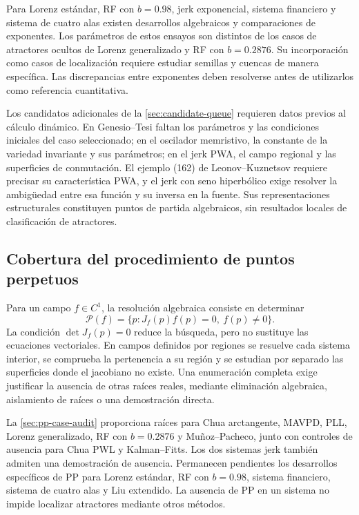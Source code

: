 Para Lorenz estándar, RF con \(b=0.98\), jerk exponencial, sistema financiero
y sistema de cuatro alas existen desarrollos algebraicos y comparaciones de
exponentes. Los parámetros de estos ensayos son distintos de los casos de
atractores ocultos de Lorenz generalizado y RF con \(b=0.2876\).
Su incorporación como casos de localización requiere estudiar semillas y
cuencas de manera específica. Las discrepancias entre exponentes deben
resolverse antes de utilizarlos como referencia cuantitativa.

Los candidatos adicionales de la \cref{sec:candidate-queue} requieren datos
previos al cálculo dinámico. En Genesio--Tesi faltan los parámetros y las
condiciones iniciales del caso seleccionado; en el oscilador memristivo, la
constante de la variedad invariante y sus parámetros; en el jerk PWA, el
campo regional y las superficies de conmutación. El ejemplo (162) de
Leonov--Kuznetsov requiere precisar su característica PWA, y el jerk con seno
hiperbólico exige resolver la ambigüedad entre esa función y su inversa en la
fuente. Sus representaciones estructurales constituyen puntos de partida
algebraicos, sin resultados locales de clasificación de atractores.

\subsection{Cobertura del procedimiento de puntos perpetuos}

Para un campo \(f\in C^1\), la resolución algebraica consiste en determinar
\[
 \mathcal P(f)=\{p:J_f(p)f(p)=0,\ f(p)\ne0\}.
\]
La condición \(\det J_f(p)=0\) reduce la búsqueda, pero no sustituye las
ecuaciones vectoriales. En campos definidos por regiones se resuelve cada
sistema interior, se comprueba la pertenencia a su región y se estudian por
separado las superficies donde el jacobiano no existe. Una enumeración
completa exige justificar la ausencia de otras raíces reales, mediante
eliminación algebraica, aislamiento de raíces o una demostración directa.

La \cref{sec:pp-case-audit} proporciona raíces para Chua arctangente, MAVPD,
PLL, Lorenz generalizado, RF con \(b=0.2876\) y Muñoz--Pacheco, junto con
controles de ausencia para Chua PWL y Kalman--Fitts. Los dos sistemas jerk
también admiten una demostración de ausencia. Permanecen pendientes los
desarrollos específicos de PP para Lorenz estándar, RF con \(b=0.98\),
sistema financiero, sistema de cuatro alas y Liu extendido. La ausencia de PP
en un sistema no impide localizar atractores mediante otros métodos.

